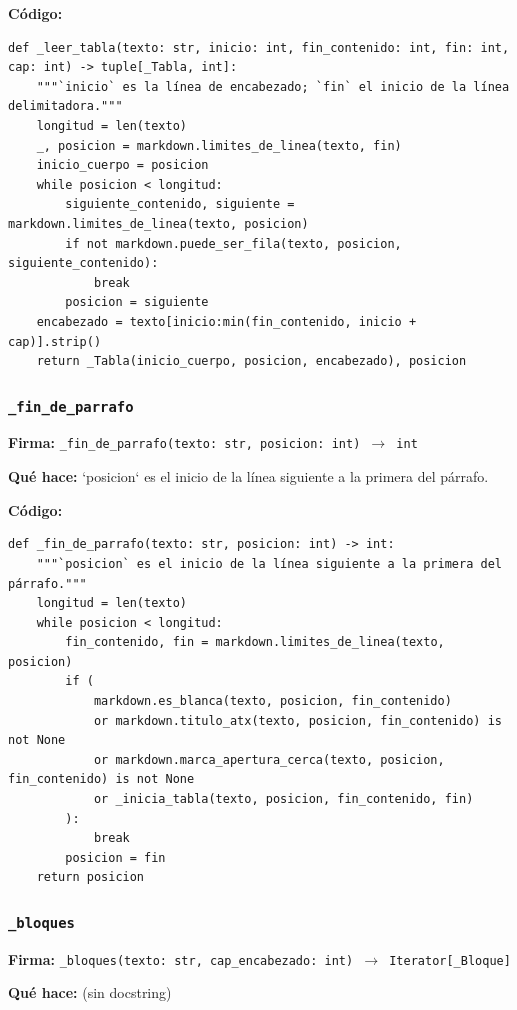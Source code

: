 \documentclass[11pt,a4paper]{article}
\begin{document}
\textbf{Código:}
\begin{lstlisting}
def _leer_tabla(texto: str, inicio: int, fin_contenido: int, fin: int, cap: int) -> tuple[_Tabla, int]:
    """`inicio` es la línea de encabezado; `fin` el inicio de la línea delimitadora."""
    longitud = len(texto)
    _, posicion = markdown.limites_de_linea(texto, fin)
    inicio_cuerpo = posicion
    while posicion < longitud:
        siguiente_contenido, siguiente = markdown.limites_de_linea(texto, posicion)
        if not markdown.puede_ser_fila(texto, posicion, siguiente_contenido):
            break
        posicion = siguiente
    encabezado = texto[inicio:min(fin_contenido, inicio + cap)].strip()
    return _Tabla(inicio_cuerpo, posicion, encabezado), posicion
\end{lstlisting}

\subsubsection*{\texttt{\_fin\_de\_parrafo}}
\textbf{Firma:} \texttt{\_fin\_de\_parrafo(texto: str, posicion: int) $\rightarrow$ int}

\textbf{Qué hace:} `posicion` es el inicio de la línea siguiente a la primera del párrafo.

\textbf{Código:}
\begin{lstlisting}
def _fin_de_parrafo(texto: str, posicion: int) -> int:
    """`posicion` es el inicio de la línea siguiente a la primera del párrafo."""
    longitud = len(texto)
    while posicion < longitud:
        fin_contenido, fin = markdown.limites_de_linea(texto, posicion)
        if (
            markdown.es_blanca(texto, posicion, fin_contenido)
            or markdown.titulo_atx(texto, posicion, fin_contenido) is not None
            or markdown.marca_apertura_cerca(texto, posicion, fin_contenido) is not None
            or _inicia_tabla(texto, posicion, fin_contenido, fin)
        ):
            break
        posicion = fin
    return posicion
\end{lstlisting}

\subsubsection*{\texttt{\_bloques}}
\textbf{Firma:} \texttt{\_bloques(texto: str, cap\_encabezado: int) $\rightarrow$ Iterator[\_Bloque]}

\textbf{Qué hace:} (sin docstring)
\end{document}
